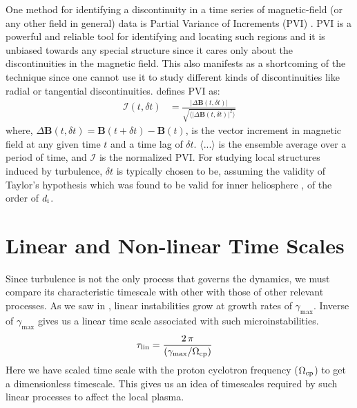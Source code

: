             One method for identifying a discontinuity in a time series of magnetic-field (or any
            other field in general) data is Partial Variance of Increments (PVI) \citep{Greco2008}.
            PVI is a powerful and reliable tool for identifying and locating such regions and it is
            unbiased towards any special structure since it cares only about the discontinuities in
            the magnetic field. This also manifests as a shortcoming of the technique since one
            cannot use it to study different kinds of discontinuities like radial or tangential
            discontinuities. \citet{Greco2008} defines PVI as:
            \begin{align}
                \mathcal{I}(t, \delta t) & = \frac{|\Delta \mathbf{B}(t, \delta t)|}{
                    \sqrt{\langle |\Delta \mathbf{B}(t, \delta t)|^2 \rangle}} \label{eq:pvi}
            \end{align}
            where, $\Delta \mathbf{B}(t, \delta t) = \mathbf{B}(t+\delta t) - \mathbf{B}(t)$, is the
            vector increment in magnetic field at any given time $t$ and a time lag of $\delta t$.
            $\langle ...  \rangle$ is the ensemble average over a period of time, and $\mathcal{I}$
            is the normalized PVI. For studying local structures induced by turbulence, $\delta t$
            is typically chosen to be, assuming the validity of Taylor's hypothesis
            \citep{Taylor1938} which was found to be valid for inner heliosphere
            \citep{Chasapis2021}, of the order of $d_{\rm i}$.

    \section{Linear and Non-linear Time Scales} \label{sec:nlts}

        Since turbulence is not the only process that governs the dynamics, we must compare its
        characteristic timescale with other with those of other relevant processes. As we saw in
        , linear instabilities grow at growth rates of $\gamma_{\max}$. Inverse of
        $\gamma_{\max}$ gives us a linear time scale associated with such microinstabilities.
        \begin{align}
            \tau_{\rm lin} & = \frac{2\,\pi}{\left(\gamma_{\max}/\Omega_{\rm cp}\right)} \label{eq:lt}
        \end{align}
        Here we have scaled time scale with the proton cyclotron frequency ($\Omega_{\rm{cp}}$) to
        get a dimensionless timescale. This gives us an idea of timescales required by such linear
        processes to affect the local plasma.

